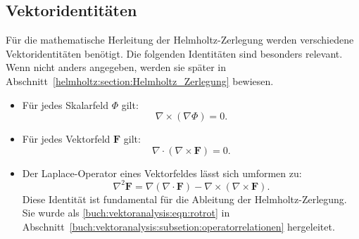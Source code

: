 \subsection{Vektoridentitäten
\label{helmholtz:subsection:Vektoridentitaeten}}
Für die mathematische Herleitung der Helmholtz-Zerlegung werden
verschiedene Vektor\-identitäten benötigt.
%
%
Die folgenden Identitäten sind besonders relevant.
Wenn nicht anders angegeben, werden sie später in
Abschnitt~\ref{helmholtz:section:Helmholtz_Zerlegung} bewiesen.
\begin{itemize}
\item Für jedes Skalarfeld $\Phi$ gilt:
\begin{equation}
\nabla \times (\nabla \Phi) = 0.
\label{helmholtz:eqn:rotgradphi}
\end{equation}
\item Für jedes Vektorfeld $\boldsymbol{F}$ gilt:
\begin{equation}
\nabla \cdot (\nabla \times \boldsymbol{F}) = 0.
\label{helmholtz:eqn:divrotF}
\end{equation}
\item Der Laplace-Operator eines Vektorfeldes lässt sich umformen zu:
\begin{equation}
\nabla^2 \boldsymbol{F} = \nabla(\nabla \cdot \boldsymbol{F}) - \nabla \times (\nabla \times \boldsymbol{F}).
\end{equation}
Diese Identität ist fundamental für die Ableitung der Helmholtz-Zerlegung.
Sie wurde als \eqref{buch:vektoranalysis:eqn:rotrot} in
Abschnitt~\ref{buch:vektoranalysis:subsetion:operatorrelationen} hergeleitet.
\end{itemize}




